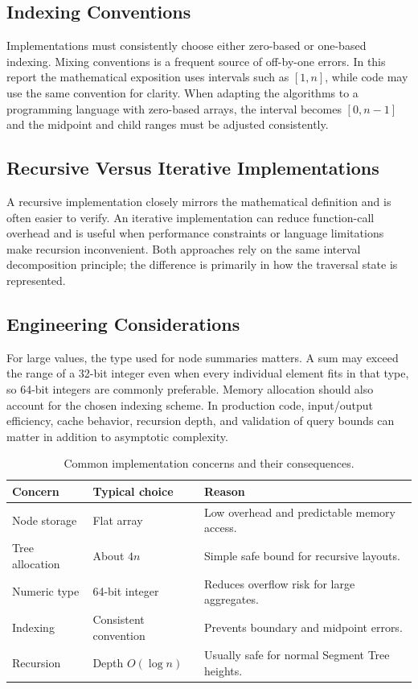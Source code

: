 \documentclass[11pt,open=any]{scrreprt}
\begin{document}
\subsection{Indexing Conventions}
Implementations must consistently choose either zero-based or one-based indexing. Mixing conventions is a frequent source of off-by-one errors. In this report the mathematical exposition uses intervals such as $[1,n]$, while code may use the same convention for clarity. When adapting the algorithms to a programming language with zero-based arrays, the interval becomes $[0,n-1]$ and the midpoint and child ranges must be adjusted consistently.

\subsection{Recursive Versus Iterative Implementations}
A recursive implementation closely mirrors the mathematical definition and is often easier to verify. An iterative implementation can reduce function-call overhead and is useful when performance constraints or language limitations make recursion inconvenient. Both approaches rely on the same interval decomposition principle; the difference is primarily in how the traversal state is represented.

\subsection{Engineering Considerations}
For large values, the type used for node summaries matters. A sum may exceed the range of a 32-bit integer even when every individual element fits in that type, so 64-bit integers are commonly preferable. Memory allocation should also account for the chosen indexing scheme. In production code, input/output efficiency, cache behavior, recursion depth, and validation of query bounds can matter in addition to asymptotic complexity.

\begin{table}[H]
\centering
\caption{Common implementation concerns and their consequences.}
\label{tab:implementation}
\begin{tabular}{p{4cm}p{3.1cm}p{5.2cm}}
\toprule
\textbf{Concern} & \textbf{Typical choice} & \textbf{Reason}\\
\midrule
Node storage & Flat array & Low overhead and predictable memory access.\\
Tree allocation & About $4n$ & Simple safe bound for recursive layouts.\\
Numeric type & 64-bit integer & Reduces overflow risk for large aggregates.\\
Indexing & Consistent convention & Prevents boundary and midpoint errors.\\
Recursion & Depth $O(\log n)$ & Usually safe for normal Segment Tree heights.\\
\bottomrule
\end{tabular}
\end{table}
\end{document}
